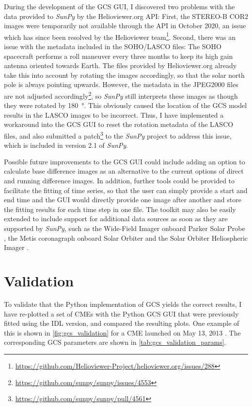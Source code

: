 During the development of the GCS GUI, I discovered two problems with the data provided to \textit{SunPy} by the Helioviewer.org API: First, the STEREO-B COR2 images were temporarily not available through the API in October 2020, an issue which has since been resolved by the Helioviewer team\footnote{\url{https://github.com/Helioviewer-Project/helioviewer.org/issues/288}}. Second, there was an issue with the metadata included in the SOHO/LASCO files: The SOHO spacecraft performs a roll maneuver every three months to keep its high gain antenna oriented towards Earth. The files provided by Helioviewer.org already take this into account by rotating the images accordingly, so that the solar north pole is always pointing upwards. However, the metadata in the JPEG2000 files are not adjusted accordingly\footnote{\url{https://github.com/sunpy/sunpy/issues/4553}}, so \textit{SunPy} still interprets these images as though they were rotated by \SI{180}{\degree}. This obviously caused the location of the GCS model results in the LASCO images to be incorrect. Thus, I have implemented a workaround into the GCS GUI to reset the rotation metadata of the LASCO files, and also submitted a patch\footnote{\url{https://github.com/sunpy/sunpy/pull/4561}} to the \textit{SunPy} project to address this issue, which is included in version 2.1 of \textit{SunPy}.

Possible future improvements to the GCS GUI could include adding an option to calculate base difference images as an alternative to the current options of direct and running difference images. In addition, further tools could be provided to facilitate the fitting of time series, so that the user can simply provide a start and end time and the GUI would directly provide one image after another and store the fitting results for each time step in one file. The toolkit may also be easily extended to include support for additional data sources as soon as they are supported by \textit{SunPy}, such as the Wide-Field Imager onboard Parker Solar Probe \citep[WISPR,][]{Vourlidas-2016-WISPR}, the Metis coronagraph onboard Solar Orbiter \citep{Antonucci-2020-Metis} and the Solar Orbiter Heliospheric Imager \citep[SoloHI,]{Howard-2020-SoloHI}.

\section{Validation}

To validate that the Python implementation of GCS yields the correct results, I have re-plotted a set of CMEs with the Python GCS GUI that were previously fitted using the IDL version, and compared the resulting plots. One example of this is shown in \autoref{fig:gcs_validation} for a CME launched on May 13, 2013 \citep[originally reconstructed by][Figure 2]{Gou-2020}. The corresponding GCS parameters are shown in \autoref{tab:gcs_validation_params}.

